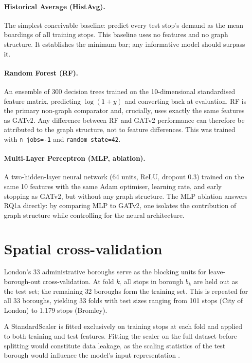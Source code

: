\documentclass[12pt,a4paper]{report}
\begin{document}
\paragraph{Historical Average (HistAvg).}
The simplest conceivable baseline: predict every test stop's demand as the
mean boardings of all training stops. This baseline uses no features and no
graph structure. It establishes the minimum bar; any informative model should
surpass it.

\paragraph{Random Forest (RF).}
An ensemble of 300 decision trees trained on the 10-dimensional standardised
feature matrix, predicting $\log(1+y)$ and converting back at evaluation.
RF is the primary non-graph comparator and, crucially, uses exactly the same
features as GATv2. Any difference between RF and GATv2 performance can
therefore be attributed to the graph structure, not to feature differences.
This was trained with \texttt{n\_jobs=-1} and \texttt{random\_state=42}.

\paragraph{Multi-Layer Perceptron (MLP, ablation).}
A two-hidden-layer neural network (64 units, ReLU, dropout 0.3) trained on
the same 10 features with the same Adam optimiser, learning rate, and early
stopping as GATv2, but without any graph structure. The MLP ablation answers
RQ1a directly: by comparing MLP to GATv2, one isolates the contribution of
graph structure while controlling for the neural architecture.

\section{Spatial cross-validation}
\label{sec:spatialcv}
London's 33 administrative boroughs serve as the blocking units for
leave-borough-out cross-validation. At fold $k$, all stops in borough $b_k$
are held out as the test set; the remaining 32 boroughs form the training set.
This is repeated for all 33 boroughs, yielding 33 folds with test sizes
ranging from 101 stops (City of London) to 1,179 stops (Bromley).

A StandardScaler is fitted exclusively on training stops at each fold and
applied to both training and test features. Fitting the scaler on the full
dataset before splitting would constitute data leakage, as the scaling
statistics of the test borough would influence the model's input representation
\citep{kaufman2012leakage}.
\end{document}
